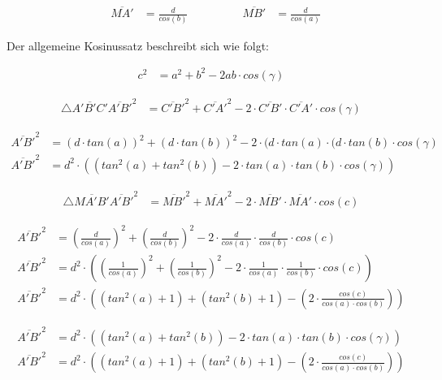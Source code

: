 \begin{refsection}
\[
\begin{aligned}
&\overline{MA'} &= \frac{ d }{cos(b)}
&
&
&
&
&
&\overline{MB'} &= \frac{ d }{cos(a)}
\end{aligned}
\]

Der allgemeine Kosinussatz beschreibt sich wie folgt:

\begin{align*}
c^{ 2 } &= a^{ 2 } + b^{ 2 } - 2ab \cdot cos(\gamma)
\end{align*}

\begin{align*}
\triangle \overline{A'B'C' }
\overline{ A'B' }^{ 2 } &= \overline{ C'B' }^{ 2 } + \overline{ C'A' }^{ 2 } - 2 \cdot \overline{ C'B' } \cdot \overline{ C'A' } \cdot cos(\gamma)
\end{align*}



\begin{align*}
\overline{A'B'}^{ 2 } &= (d\cdot tan(a))^{ 2 } + (d\cdot tan(b))^{ 2 } - 2 \cdot (d\cdot tan(a) \cdot (d\cdot tan(b) \cdot cos(\gamma)\\
\overline{A'B'}^{ 2 } &= d^{ 2 } \cdot \left(\left(tan^{ 2 }(a) + tan^{ 2 }(b)\right) - 2\cdot tan(a) \cdot tan(b) \cdot cos(\gamma)\right)
\end{align*}

\begin{align*}
\triangle \overline{ MA'B' }
\overline{ A'B' }^{ 2 } &= \overline{ MB' }^{ 2 } + \overline{ MA' }^{ 2 } - 2\cdot \overline{ MB'} \cdot \overline{ MA' } \cdot cos(c)
\end{align*}


\begin{align*}
\overline{ A'B'}^{ 2 } &= \left(\frac{ d }{ cos(a) }  \right)^{ 2 } + \left(\frac{ d }{ cos(b)}  \right)^{ 2 } - 2 \cdot \frac{ d }{ cos(a)} \cdot \frac{ d }{ cos(b)} \cdot cos(c) \\
\overline{ A'B' }^{ 2 } &= d^{ 2 } \cdot \left(\left(\frac{ 1 }{ cos(a) }  \right)^{ 2 } + \left(\frac{ 1 }{ cos(b) }  \right)^{ 2 } - 2 \cdot \frac{ 1 }{ cos(a)} \cdot \frac{ 1 }{ cos(b)} \cdot cos(c)\right)\\
\overline{ A'B' }^{ 2 } &= d^{ 2 } \cdot \left(\left(tan^{ 2 }(a) + 1\right) + \left(tan^{ 2 }(b) + 1\right) - \left(2 \cdot \frac{cos(c)}{cos(a) \cdot cos(b)}\right)\right)
\end{align*}



\begin{align*}
\overline{ A'B'}^{ 2 } &= d^{ 2 } \cdot \left(\left(tan^{ 2 }(a) + tan^{ 2 }(b)\right) - 2 \cdot tan(a) \cdot tan(b) \cdot cos(\gamma)\right) \\
\overline{ A'B'}^{ 2 } &= d^{ 2 } \cdot \left(\left(tan^{ 2 }(a) + 1\right) + \left(tan^{ 2 }(b) + 1\right) - \left(2 \cdot \frac{cos(c)}{cos(a) \cdot cos(b)}\right)\right)
\end{align*}



\end{refsection}
